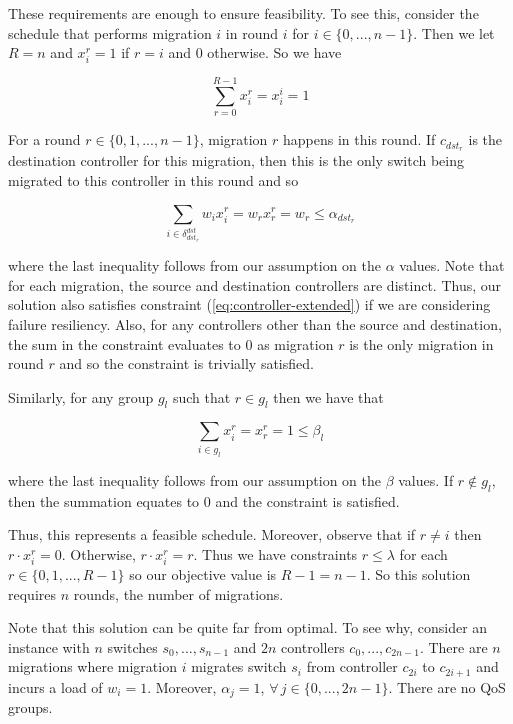 \documentclass[conference]{IEEEtran}
\begin{document}
These requirements are enough to ensure feasibility. To see this, consider the schedule that performs migration $i$ in round $i$ for $i \in \{0, ..., n - 1\}$. Then we let $R = n$ and $x^{r}_{i} = 1$ if $r = i$ and 0 otherwise. So we have

$$\sum_{r=0}^{R-1} x^{r}_{i} = x^{i}_{i} = 1$$

For a round $r \in \{0, 1, ..., n - 1\}$, migration $r$ happens in this round. If $c_{dst_{r}}$ is the destination controller for this migration, then this is the only switch being migrated to this controller in this round and so

$$\sum_{i \in \delta^{dst}_{dst_{r}}} w_{i}x^{r}_{i} = w_{r}x^{r}_{r} = w_{r} \leq \alpha_{dst_{r}}$$

where the last inequality follows from our assumption on the $\alpha$ values. Note that for each migration, the source and destination controllers are distinct. Thus, our solution also satisfies constraint (\ref{eq:controller-extended}) if we are considering failure resiliency. Also, for any controllers other than the source and destination, the sum in the constraint evaluates to 0 as migration $r$ is the only migration in round $r$ and so the constraint is trivially satisfied.

Similarly, for any group $g_{l}$ such that $r \in g_{l}$ then we have that

$$\sum_{i \in g_{l}} x^{r}_{i} = x^{r}_{r} = 1 \leq \beta_{l}$$

where the last inequality follows from our assumption on the $\beta$ values. If $r \notin g_{l}$, then the summation equates to 0 and the constraint is satisfied. 

Thus, this represents a feasible schedule. Moreover, observe that if $r \neq i$ then $r \cdot x^{r}_{i} = 0$. Otherwise, $r \cdot x^{r}_{i} = r$. Thus we have constraints $r \leq \lambda$ for each $r \in \{0, 1, ..., R - 1\}$ so our objective value is $R - 1 = n - 1$. So this solution requires $n$ rounds, the number of migrations.

Note that this solution can be quite far from optimal. To see why, consider an instance with $n$ switches $s_{0}, ..., s_{n-1}$ and $2n$ controllers $c_{0}, ..., c_{2n - 1}$. There are $n$ migrations where migration $i$ migrates switch $s_{i}$ from controller $c_{2i}$ to $c_{2i + 1}$ and incurs a load of $w_{i} = 1$. Moreover, $\alpha_{j} = 1$, \newline $\forall \, j \in \{0, ..., 2n - 1\}$. There are no QoS groups.
\end{document}

